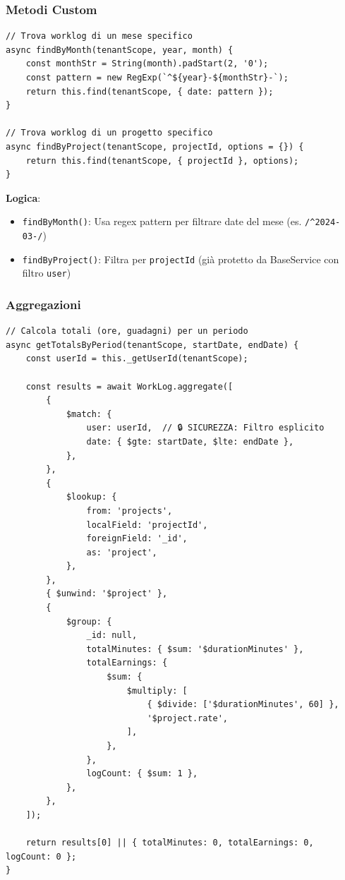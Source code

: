 \documentclass[11pt,a4paper]{article}
\begin{document}
\subsubsection{Metodi Custom}

\begin{lstlisting}
// Trova worklog di un mese specifico
async findByMonth(tenantScope, year, month) {
    const monthStr = String(month).padStart(2, '0');
    const pattern = new RegExp(`^${year}-${monthStr}-`);
    return this.find(tenantScope, { date: pattern });
}

// Trova worklog di un progetto specifico
async findByProject(tenantScope, projectId, options = {}) {
    return this.find(tenantScope, { projectId }, options);
}
\end{lstlisting}

\textbf{Logica}:
\begin{itemize}
    \item \texttt{findByMonth()}: Usa regex pattern per filtrare date del mese (es. \texttt{/^2024-03-/})
    \item \texttt{findByProject()}: Filtra per \texttt{projectId} (già protetto da BaseService con filtro \texttt{user})
\end{itemize}

\subsubsection{Aggregazioni}

\begin{lstlisting}
// Calcola totali (ore, guadagni) per un periodo
async getTotalsByPeriod(tenantScope, startDate, endDate) {
    const userId = this._getUserId(tenantScope);
    
    const results = await WorkLog.aggregate([
        {
            $match: {
                user: userId,  // 🔒 SICUREZZA: Filtro esplicito
                date: { $gte: startDate, $lte: endDate },
            },
        },
        {
            $lookup: {
                from: 'projects',
                localField: 'projectId',
                foreignField: '_id',
                as: 'project',
            },
        },
        { $unwind: '$project' },
        {
            $group: {
                _id: null,
                totalMinutes: { $sum: '$durationMinutes' },
                totalEarnings: {
                    $sum: {
                        $multiply: [
                            { $divide: ['$durationMinutes', 60] },
                            '$project.rate',
                        ],
                    },
                },
                logCount: { $sum: 1 },
            },
        },
    ]);
    
    return results[0] || { totalMinutes: 0, totalEarnings: 0, logCount: 0 };
}
\end{lstlisting}
\end{document}
